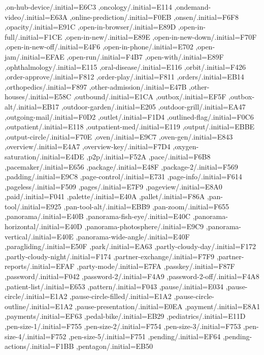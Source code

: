 { ,on-hub-device/.initial=E6C3
 ,oncology/.initial=E114
 ,ondemand-video/.initial=E63A
 ,online-prediction/.initial=F0EB
 ,onsen/.initial=F6F8
 ,opacity/.initial=E91C
 ,open-in-browser/.initial=E89D
 ,open-in-full/.initial=F1CE
 ,open-in-new/.initial=E89E
 ,open-in-new-down/.initial=F70F
 ,open-in-new-off/.initial=E4F6
 ,open-in-phone/.initial=E702
 ,open-jam/.initial=EFAE
 ,open-run/.initial=F4B7
 ,open-with/.initial=E89F
 ,ophthalmology/.initial=E115
 ,oral-disease/.initial=E116
 ,orbit/.initial=F426
 ,order-approve/.initial=F812
 ,order-play/.initial=F811
 ,orders/.initial=EB14
 ,orthopedics/.initial=F897
 ,other-admission/.initial=E47B
 ,other-houses/.initial=E58C
 ,outbound/.initial=E1CA
 ,outbox/.initial=EF5F
 ,outbox-alt/.initial=EB17
 ,outdoor-garden/.initial=E205
 ,outdoor-grill/.initial=EA47
 ,outgoing-mail/.initial=F0D2
 ,outlet/.initial=F1D4
 ,outlined-flag/.initial=F0C6
 ,outpatient/.initial=E118
 ,outpatient-med/.initial=E119
 ,output/.initial=EBBE
 ,output-circle/.initial=F70E
 ,oven/.initial=E9C7
 ,oven-gen/.initial=E843
 ,overview/.initial=E4A7
 ,overview-key/.initial=F7D4
 ,oxygen-saturation/.initial=E4DE
 ,p2p/.initial=F52A
 ,pace/.initial=F6B8
 ,pacemaker/.initial=E656
 ,package/.initial=E48F
 ,package-2/.initial=F569
 ,padding/.initial=E9C8
 ,page-control/.initial=E731
 ,page-info/.initial=F614
 ,pageless/.initial=F509
 ,pages/.initial=E7F9
 ,pageview/.initial=E8A0
 ,paid/.initial=F041
 ,palette/.initial=E40A
 ,pallet/.initial=F86A
 ,pan-tool/.initial=E925
 ,pan-tool-alt/.initial=EBB9
 ,pan-zoom/.initial=F655
 ,panorama/.initial=E40B
 ,panorama-fish-eye/.initial=E40C
 ,panorama-horizontal/.initial=E40D
 ,panorama-photosphere/.initial=E9C9
 ,panorama-vertical/.initial=E40E
 ,panorama-wide-angle/.initial=E40F
 ,paragliding/.initial=E50F
 ,park/.initial=EA63
 ,partly-cloudy-day/.initial=F172
 ,partly-cloudy-night/.initial=F174
 ,partner-exchange/.initial=F7F9
 ,partner-reports/.initial=EFAF
 ,party-mode/.initial=E7FA
 ,passkey/.initial=F87F
 ,password/.initial=F042
 ,password-2/.initial=F4A9
 ,password-2-off/.initial=F4A8
 ,patient-list/.initial=E653
 ,pattern/.initial=F043
 ,pause/.initial=E034
 ,pause-circle/.initial=E1A2
 ,pause-circle-filled/.initial=E1A2
 ,pause-circle-outline/.initial=E1A2
 ,pause-presentation/.initial=E0EA
 ,payment/.initial=E8A1
 ,payments/.initial=EF63
 ,pedal-bike/.initial=EB29
 ,pediatrics/.initial=E11D
 ,pen-size-1/.initial=F755
 ,pen-size-2/.initial=F754
 ,pen-size-3/.initial=F753
 ,pen-size-4/.initial=F752
 ,pen-size-5/.initial=F751
 ,pending/.initial=EF64
 ,pending-actions/.initial=F1BB
 ,pentagon/.initial=EB50
}
